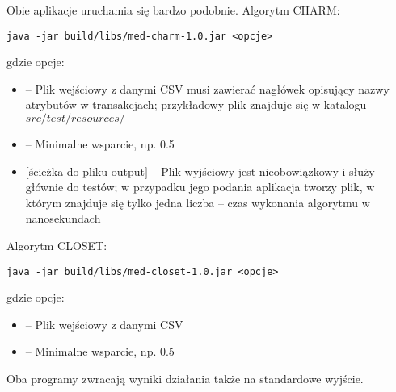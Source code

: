 Obie aplikacje uruchamia się bardzo podobnie. Algorytm CHARM:
\begin{lstlisting}
java -jar build/libs/med-charm-1.0.jar <opcje>
\end{lstlisting}
gdzie opcje:
\begin{itemize}
	\item <ścieżka do pliku z danymi CSV> -- Plik wejściowy z danymi CSV musi zawierać nagłówek opisujący nazwy atrybutów w transakcjach; przykładowy plik znajduje się w katalogu $src/test/resources/$
	\item <minimalne wsparcie relatywne> -- Minimalne wsparcie, np. 0.5
	\item $[$ścieżka do pliku output$]$ -- Plik wyjściowy jest nieobowiązkowy i służy głównie do testów; w przypadku jego podania aplikacja tworzy plik, w którym znajduje się tylko jedna liczba -- czas wykonania algorytmu w nanosekundach
\end{itemize}

Algorytm CLOSET:
\begin{lstlisting}
java -jar build/libs/med-closet-1.0.jar <opcje>
\end{lstlisting}
gdzie opcje:
\begin{itemize}
	\item <ścieżka do pliku z danymi CSV> -- Plik wejściowy z danymi CSV
	\item <minimalne wsparcie relatywne> -- Minimalne wsparcie, np. 0.5
\end{itemize}

Oba programy zwracają wyniki działania także na standardowe wyjście.